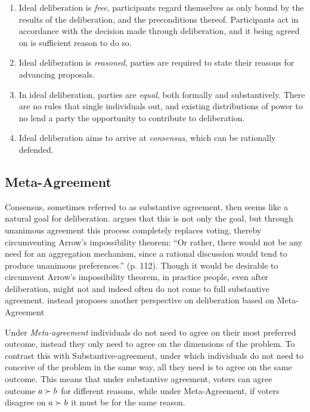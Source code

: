 \begin{enumerate}
	\label{list:ideal-deliberation}
	\setlength\itemsep{1px}
	\item  Ideal deliberation is \emph{free}, participants regard themselves as only bound by the results of the deliberation, and the preconditions thereof. Participants act in accordance with the decision made through deliberation, and it being agreed on is sufficient reason to do so.
	\item  Ideal deliberation is \emph{reasoned}, parties are required to state their reasons for advancing proposals.
	\item  In ideal deliberation, parties are \emph{equal}, both formally and substantively. There are no rules that single individuals out, and existing distributions of power to no lend a party the opportunity to contribute to deliberation.
	\item  Ideal deliberation aims to arrive at \emph{consensus}, which can be rationally defended.
\end{enumerate}

\subsection{Meta-Agreement}
\label{subsection:Meta-agreement}

Consensus, sometimes referred to as substantive agreement, then seems like a
natural goal for deliberation. \citet{elsterMarketForumThree2002} argues that
this is not only the goal, but through unanimous agreement this process
completely replaces voting, thereby circumventing Arrow's impossibility
theorem: ``Or rather, there would not be any need for an aggregation mechanism,
since a rational discussion would tend to produce unanimous preferences.'' (p.
112). Though it would be desirable to circumvent Arrow's impossibility theorem,
in practice people, even after deliberation, might not and indeed often do not
come to full substantive agreement. \citet{listTwoConceptsAgreement2002}
instead proposes another perspective  on deliberation based on Meta-Agreement

Under \emph{Meta-agreement} individuals do not need to agree on their most
preferred outcome, instead they only need to agree on the dimensions of the
problem. To contrast this with Substantive-agreement, under which individuals
do not need to conceive of the problem in the same way, all they need is to
agree on the same outcome. This means that under substantive agreement, voters
can agree outcome $a \succ b$ for different reasons, while under
Meta-Agreement, if voters disagree on $a \succ b$ it must be for the same
reason.

